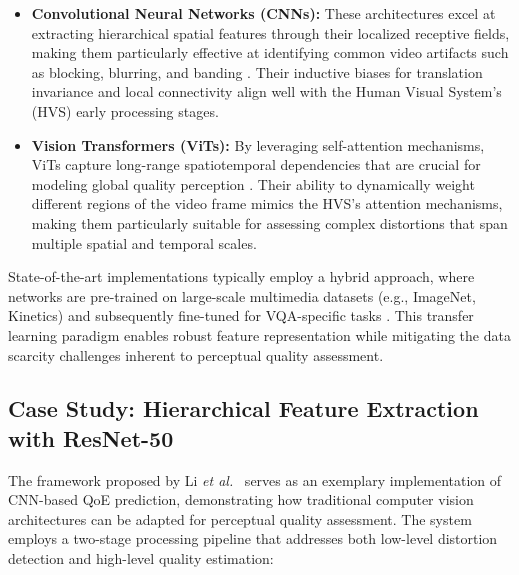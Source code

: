 \begin{itemize}  
    \item \textbf{Convolutional Neural Networks (CNNs):} These architectures excel at extracting hierarchical spatial features through their localized receptive fields, making them particularly effective at identifying common video artifacts such as blocking, blurring, and banding \cite{he2016deep}. Their inductive biases for translation invariance and local connectivity align well with the Human Visual System's (HVS) early processing stages.
    
    \item \textbf{Vision Transformers (ViTs):} By leveraging self-attention mechanisms, ViTs capture long-range spatiotemporal dependencies that are crucial for modeling global quality perception \cite{dosovitskiy2020image}. Their ability to dynamically weight different regions of the video frame mimics the HVS's attention mechanisms, making them particularly suitable for assessing complex distortions that span multiple spatial and temporal scales.
\end{itemize}  

State-of-the-art implementations typically employ a hybrid approach, where networks are pre-trained on large-scale multimedia datasets (e.g., ImageNet, Kinetics) and subsequently fine-tuned for VQA-specific tasks \cite{li2023unified}. This transfer learning paradigm enables robust feature representation while mitigating the data scarcity challenges inherent to perceptual quality assessment.

\subsection{Case Study: Hierarchical Feature Extraction with ResNet-50}  
The framework proposed by Li \textit{et al.}~\cite{li2023unified} serves as an exemplary implementation of CNN-based QoE prediction, demonstrating how traditional computer vision architectures can be adapted for perceptual quality assessment. The system employs a two-stage processing pipeline that addresses both low-level distortion detection and high-level quality estimation:

